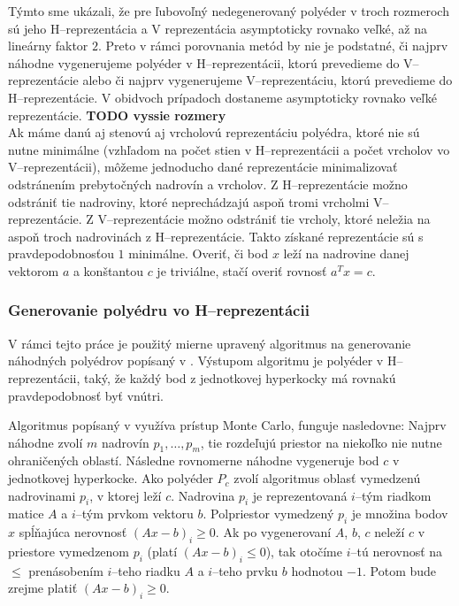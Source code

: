 Týmto sme ukázali, že pre ľubovoľný nedegenerovaný polyéder v troch rozmeroch sú jeho H--reprezentácia a V reprezentácia asymptoticky rovnako veľké, až na lineárny faktor $2$.
Preto v rámci porovnania metód by nie je podstatné, či najprv náhodne vygenerujeme polyéder v H--reprezentácii, ktorú prevedieme do V--reprezentácie alebo či najprv vygenerujeme V--reprezentáciu, ktorú prevedieme do H--reprezentácie. V obidvoch prípadoch dostaneme asymptoticky rovnako veľké reprezentácie. \textbf{TODO vyssie rozmery}\\


Ak máme danú aj stenovú aj vrcholovú reprezentáciu polyédra, ktoré nie sú nutne minimálne (vzhľadom na počet stien v H--reprezentácii a počet vrcholov vo V--reprezentácii), môžeme jednoducho dané reprezentácie minimalizovať odstránením prebytočných nadrovín a vrcholov. Z H--reprezentácie možno odstrániť tie nadroviny, ktoré neprechádzajú aspoň tromi vrcholmi V--reprezentácie. Z V--reprezentácie možno odstrániť tie vrcholy, ktoré neležia na aspoň troch nadrovinách z H--reprezentácie. Takto získané reprezentácie sú s pravdepodobnosťou $1$ minimálne.
Overiť, či bod $x$ leží na nadrovine danej vektorom $a$ a konštantou $c$ je triviálne, stačí overiť rovnosť $a^Tx=c$.

\subsubsection{Generovanie polyédru vo H--reprezentácii}

V rámci tejto práce je použitý mierne upravený algoritmus na generovanie náhodných polyédrov popísaný v \cite{random_may}. Výstupom algoritmu je polyéder v H--reprezentácii, taký, že každý bod z jednotkovej hyperkocky má rovnakú pravdepodobnosť byť vnútri. 

Algoritmus popísaný v \cite{random_may} využíva prístup Monte Carlo, funguje nasledovne: Najprv náhodne zvolí $m$ nadrovín $p_1, \dots, p_m$, tie rozdeľujú priestor na niekoľko nie nutne ohraničených oblastí.
Následne rovnomerne náhodne vygeneruje bod $c$ v jednotkovej hyperkocke. Ako polyéder $P_c$ zvolí algoritmus oblasť vymedzenú nadrovinami $p_i$, v ktorej leží $c$. Nadrovina $p_i$ je reprezentovaná $i$--tým riadkom matice $A$ a $i$--tým prvkom vektoru $b$. Polpriestor vymedzený $p_i$ je množina bodov $x$ spĺňajúca nerovnosť $(Ax-b)_i \geq 0$. Ak po vygenerovaní $A$, $b$, $c$ neleží $c$ v priestore vymedzenom $p_i$ (platí $(Ax-b)_i \leq 0$), tak otočíme $i$--tú nerovnosť na $\leq$ prenásobením $i$--teho riadku $A$ a $i$--teho prvku $b$ hodnotou $-1$. Potom bude zrejme platiť $(Ax-b)_i \geq 0$.

